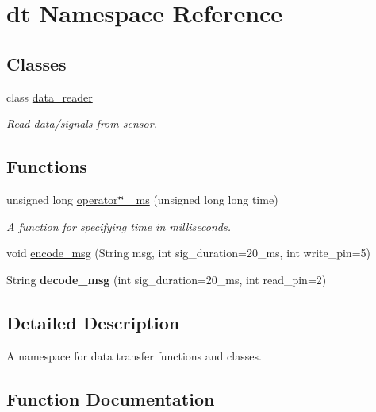 \hypertarget{namespacedt}{}\section{dt Namespace Reference}
\label{namespacedt}
\subsection*{Classes}
\begin{DoxyCompactItemize}
\item 
class \hyperlink{classdt_1_1data__reader}{data\+\_\+reader}
\begin{DoxyCompactList}\small\item\em Read data/signals from sensor. \end{DoxyCompactList}\end{DoxyCompactItemize}
\subsection*{Functions}
\begin{DoxyCompactItemize}
\item 
\mbox{\label{namespacedt_ab44fdb124992df044776c005d3e6b1ea}} 
unsigned long \hyperlink{namespacedt_ab44fdb124992df044776c005d3e6b1ea}{operator\char`\"{}\char`\"{} \+\_\+ms} (unsigned long long time)
\begin{DoxyCompactList}\small\item\em A function for specifying time in milliseconds. \end{DoxyCompactList}\item 
void \hyperlink{namespacedt_a895a4305e8593c4428b867c1675a46fa}{encode\+\_\+msg} (String msg, int sig\+\_\+duration=20\+\_\+ms, int write\+\_\+pin=5)
\item 
\mbox{\label{namespacedt_a5b66b3d9dbde9ddeacd2269ce71e7002}} 
String {\bfseries decode\+\_\+msg} (int sig\+\_\+duration=20\+\_\+ms, int read\+\_\+pin=2)
\end{DoxyCompactItemize}


\subsection{Detailed Description}
A namespace for data transfer functions and classes. 

\subsection{Function Documentation}
\mbox{\label{namespacedt_a895a4305e8593c4428b867c1675a46fa}} 
